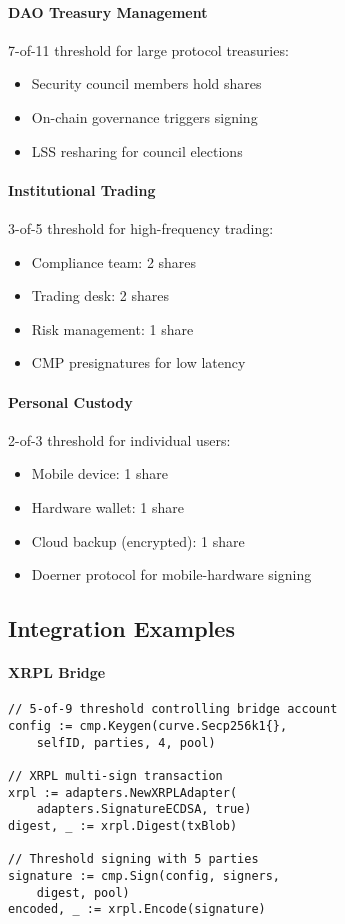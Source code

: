 \documentclass[11pt,twocolumn]{article}
\begin{document}
\paragraph{DAO Treasury Management} 7-of-11 threshold for large protocol treasuries:
\begin{itemize}
\item Security council members hold shares
\item On-chain governance triggers signing
\item LSS resharing for council elections
\end{itemize}

\paragraph{Institutional Trading} 3-of-5 threshold for high-frequency trading:
\begin{itemize}
\item Compliance team: 2 shares
\item Trading desk: 2 shares
\item Risk management: 1 share
\item CMP presignatures for low latency
\end{itemize}

\paragraph{Personal Custody} 2-of-3 threshold for individual users:
\begin{itemize}
\item Mobile device: 1 share
\item Hardware wallet: 1 share
\item Cloud backup (encrypted): 1 share
\item Doerner protocol for mobile-hardware signing
\end{itemize}

\subsection{Integration Examples}

\paragraph{XRPL Bridge}
\begin{verbatim}
// 5-of-9 threshold controlling bridge account
config := cmp.Keygen(curve.Secp256k1{},
    selfID, parties, 4, pool)

// XRPL multi-sign transaction
xrpl := adapters.NewXRPLAdapter(
    adapters.SignatureECDSA, true)
digest, _ := xrpl.Digest(txBlob)

// Threshold signing with 5 parties
signature := cmp.Sign(config, signers,
    digest, pool)
encoded, _ := xrpl.Encode(signature)
\end{verbatim}
\end{document}
